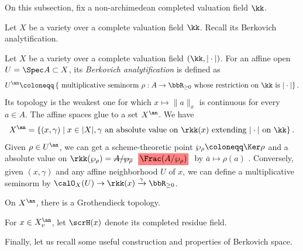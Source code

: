 On this subsection, fix a non-archimedean completed valuation field $\kk$.

Let $X$ be a variety over a complete valuation field $\kk$.
Recall its Berkovich analytification.

\begin{construction}[label=\labelNFM{constr:berkovich-analytification}, status=draft, tag=0000000]
	Let $X$ be a variety over a complete valuation field $(\kk,|\cdot|)$.
	For an affine open $U = \Spec A \subset X$, its \emph{Berkovich analytification} is defined as
	\[ U^\an \coloneqq \left\{  \text{  multiplicative seminorm } \rho: A \to \bbR_{\geq 0} \text{ whose restriction on } \kk \text{ is } |\cdot| \right\}. \]
	Its topology is the weakest one for which $x \mapsto \|a\|_x$ is continuous for every $a \in A$.
	The affine spaces glue to a set $X^\an$.
	We have
	\[ X^\an = \left\{ (x,\gamma) \;\middle|\; x \in |X|, \gamma \text{ an absolute value on } \rkk(x) \text{ extending } |\cdot| \text{ on } \kk \right\}. \]
	Given $\rho \in U^\an$, we can get a scheme-theoretic point $\wp_\rho \coloneqq \Ker \rho$ and a absolute value on $\rkk(\wp_\rho) = \latexdeletedmath{A/\wp_\rho}\latexaddedmath{\Frac(A/\wp_\rho)}$ by $\bar{a} \mapsto \rho(a)$ .
	Conversely, given $(x,\gamma)$ and any affine neighborhood $U$ of $x$, we can define a multiplicative seminorm by $\calO_X(U) \to \rkk(x) \xrightarrow{\gamma} \bbR_{\geq 0}$.

	On $X^\an$, there is a Grothendieck topology.
	\Yang{}


	For $x \in X_v^\an$, let $\scrH(x)$ denote its completed residue field.
	\Yang{}
\end{construction}


Finally, let us recall some useful construction and properties of Berkovich space.

